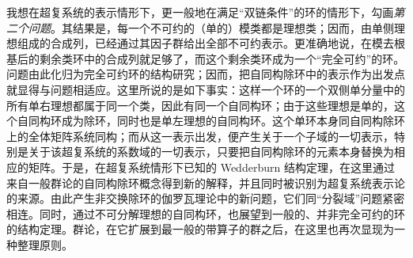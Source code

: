 我想在超复系统的表示情形下，更一般地在满足“双链条件”的环的情形下，勾画\emph{第二个问题}。其结果是，每一个不可约的（单的）模类都是理想类；因而，由单侧理想组成的合成列，已经通过其因子群给出全部不可约表示。更准确地说，在模去根基后的剩余类环中的合成列就足够了，而这个剩余类环成为一个“完全可约”的环。问题由此化归为完全可约环的结构研究；因而，把自同构除环中的表示作为出发点就显得与问题相适应。这里所说的是如下事实：这样一个环的一个双侧单分量中的所有单右理想都属于同一个类，因此有同一个自同构环；由于这些理想是单的，这个自同构环成为除环，同时也是单左理想的自同构环。这个单环本身同自同构除环上的全体矩阵系统同构；而从这一表示出发，便产生关于一个子域的一切表示，特别是关于该超复系统的系数域的一切表示，只要把自同构除环的元素本身替换为相应的矩阵。于是，在超复系统情形下已知的 Wedderburn 结构定理，在这里通过来自一般群论的自同构除环概念得到新的解释，并且同时被识别为超复系统表示论的来源。由此产生非交换除环的伽罗瓦理论中的新问题，它们同“分裂域”问题紧密相连。同时，通过不可分解理想的自同构环，也展望到一般的、并非完全可约的环的结构定理。群论，在它扩展到最一般的带算子的群之后，在这里也再次显现为一种整理原则。

\endgroup

